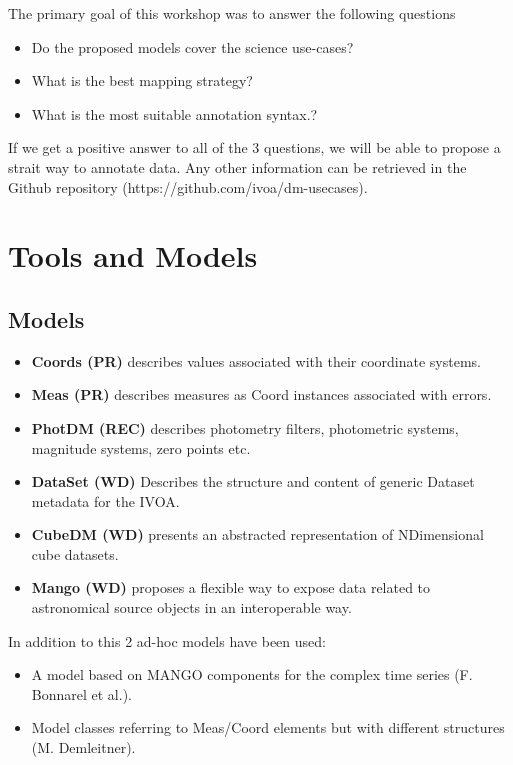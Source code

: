 \documentclass[11pt,a4paper]{ivoa}
\begin{document}
The primary goal of this workshop was to answer the following questions

\begin{itemize}
\item Do the proposed models cover the science use-cases?
\item What is the best mapping strategy?
\item What is the most suitable annotation syntax.?
\end{itemize}

If we get a positive answer to all of the 3 questions, we will be able to propose a strait way to annotate data.
Any other information can be retrieved in the Github repository (https://github.com/ivoa/dm-usecases).

\section{Tools and Models}
\subsection{Models}

\begin{itemize}
\item \textbf{Coords (PR)} describes values associated with their coordinate systems.
\item \textbf{Meas (PR)} describes measures as Coord instances associated with errors.
\item \textbf{PhotDM (REC)} describes photometry filters, photometric systems, magnitude systems, zero
points etc.
\item \textbf{DataSet (WD)} Describes the structure and
content of generic Dataset metadata for the IVOA.
\item \textbf{CubeDM  (WD)}  presents an abstracted representation of NDimensional
cube datasets.
\item \textbf{Mango (WD)}  proposes a flexible way to expose data related to astronomical
source objects in an interoperable way.
\end{itemize}

In addition to this 2 ad-hoc models have been used:
\begin{itemize}
\item A model based on MANGO components for the complex time series (F. Bonnarel et al.).
\item Model classes referring to Meas/Coord elements but with different structures (M. Demleitner).
\end{itemize}
\end{document}
